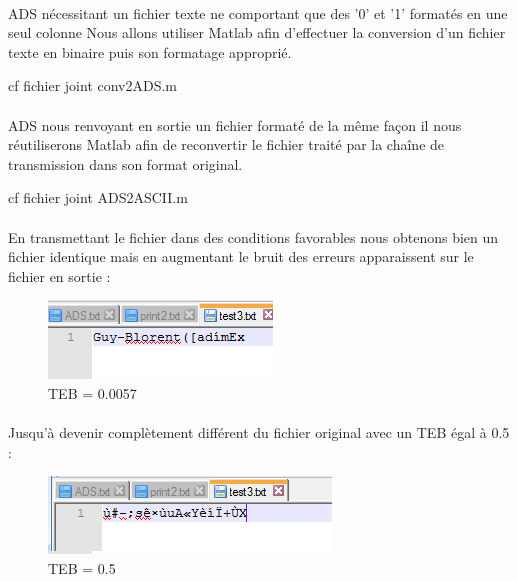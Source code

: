 \paragraph{} ADS nécessitant un fichier texte ne comportant que des '0' et '1' formatés en une seul colonne Nous allons utiliser Matlab afin d'effectuer la conversion d'un fichier texte en binaire puis son formatage approprié.

\begin{description}
\item[cf fichier joint conv2ADS.m]
\end{description}

 
\paragraph{} ADS nous renvoyant en sortie un fichier formaté de la même façon il nous réutiliserons Matlab afin de reconvertir le fichier traité par la chaîne de transmission dans son format original.

\begin{description}
\item[cf fichier joint ADS2ASCII.m]
\end{description} 

\paragraph{} En transmettant le fichier dans des conditions favorables nous obtenons bien un fichier identique mais en augmentant le bruit des erreurs apparaissent sur le fichier en sortie :
\begin{figure}[h]
  \centering
  \includegraphics{erreur_txt_teb_0_0057.png}
  \caption{TEB = 0.0057}
\end{figure}



\paragraph{}Jusqu'à devenir complètement différent du fichier original avec un TEB égal à 0.5 :
\begin{figure}[h]
  \centering
 \includegraphics{erreur_txt_teb_0_5.png}
  \caption{TEB = 0.5}
\end{figure}


